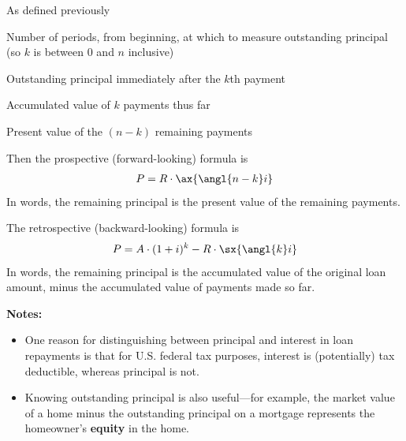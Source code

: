 \documentclass[14pt,twoside]{extarticle}
\begin{document}
\begin{description}[align=right,labelwidth=3.5cm,leftmargin=!,font=\bfseries]
  \item[n, R, i, A] As defined previously
  \item[k] Number of periods, from beginning, at which to measure outstanding principal (so $k$ is between 0 and $n$ inclusive)
  \item[P] Outstanding principal immediately after the $k$th payment
  \item[$\textbf{R} \cdot \mathbf{\sx{\angl{k} i}}$] Accumulated value of $k$ payments thus far
  \item[$\textbf{R} \cdot \mathbf{\ax{\angl{n-k} i}}$] Present value of the $(n-k)$ remaining payments
\end{description}

\pagebreak

Then the prospective (forward-looking) formula is
\begin{align*}
  P & = R \cdot \ax{ \angl{n-k} i} \\
\end{align*}
In words, the remaining principal is the present value of the remaining payments.

The retrospective (backward-looking) formula is
\begin{align*}
  P & = A \cdot (1+i)^k - R \cdot \sx{ \angl{k} i} \\
\end{align*}
In words, the remaining principal is the accumulated value of the original loan
amount, minus the accumulated value of payments made so far.

\vspace{.2in}
\textbf{Notes:}
\begin{itemize}
  \item One reason for distinguishing between principal and interest in loan repayments is that for U.S.
        federal tax purposes, interest is (potentially) tax deductible, whereas principal is not.
  \item Knowing outstanding principal is also useful---for example, the market value of a home minus the
        outstanding principal on a mortgage represents the homeowner's \textbf{equity} in the home.
\end{itemize}
\end{document}
